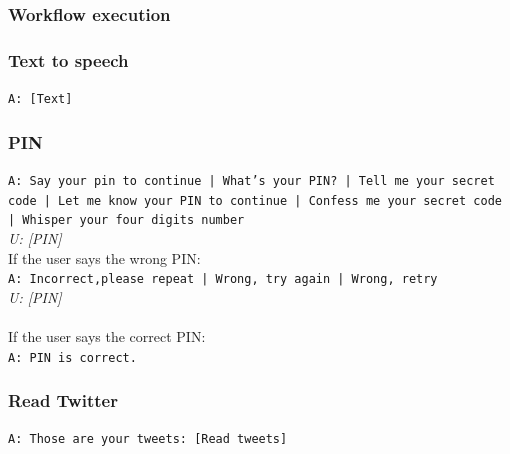 \subsubsection{Workflow execution}

\subsubsection{Text to speech}
\texttt{A: [Text]}

\subsubsection{PIN}
\texttt{A: Say your pin to continue | What's your PIN? | Tell me your secret code | Let me know your PIN to continue | Confess me your secret code | Whisper your four digits number}\\
\textit{U: [PIN] }\\
If the user says the wrong PIN:\\
\texttt{A: Incorrect,please repeat | Wrong, try again | Wrong, retry }\\
\textit{U: [PIN]}\\\\
If the user says the correct PIN:\\
\texttt{A: PIN is correct.}\\


\subsubsection{Read Twitter}
\texttt{A: Those are your tweets: [Read tweets]}\\



